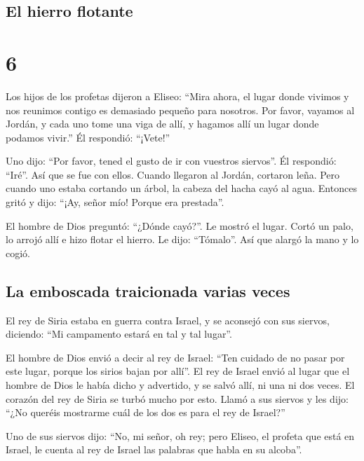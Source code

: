 \hypertarget{el-hierro-flotante}{%
\subsection{El hierro flotante}\label{el-hierro-flotante}}

\hypertarget{section-5}{%
\section{6}\label{section-5}}

 Los hijos de los profetas dijeron a Eliseo: ``Mira ahora,
el lugar donde vivimos y nos reunimos contigo es demasiado pequeño para
nosotros.  Por favor, vayamos al Jordán, y cada uno tome
una viga de allí, y hagamos allí un lugar donde podamos vivir.'' Él
respondió: ``¡Vete!''

 Uno dijo: ``Por favor, tened el gusto de ir con vuestros
siervos''. Él respondió: ``Iré''.  Así que se fue con
ellos. Cuando llegaron al Jordán, cortaron leña.  Pero
cuando uno estaba cortando un árbol, la cabeza del hacha cayó al agua.
Entonces gritó y dijo: ``¡Ay, señor mío! Porque era prestada''.

 El hombre de Dios preguntó: ``¿Dónde cayó?''. Le mostró
el lugar. Cortó un palo, lo arrojó allí e hizo flotar el hierro.
 Le dijo: ``Tómalo''. Así que alargó la mano y lo cogió.

\hypertarget{la-emboscada-traicionada-varias-veces}{%
\subsection{La emboscada traicionada varias
veces}\label{la-emboscada-traicionada-varias-veces}}

 El rey de Siria estaba en guerra contra Israel, y se
aconsejó con sus siervos, diciendo: ``Mi campamento estará en tal y tal
lugar''.

 El hombre de Dios envió a decir al rey de Israel: ``Ten
cuidado de no pasar por este lugar, porque los sirios bajan por allí''.
 El rey de Israel envió al lugar que el hombre de Dios le
había dicho y advertido, y se salvó allí, ni una ni dos veces.
 El corazón del rey de Siria se turbó mucho por esto.
Llamó a sus siervos y les dijo: ``¿No queréis mostrarme cuál de los dos
es para el rey de Israel?''

 Uno de sus siervos dijo: ``No, mi señor, oh rey; pero
Eliseo, el profeta que está en Israel, le cuenta al rey de Israel las
palabras que habla en su alcoba''.

